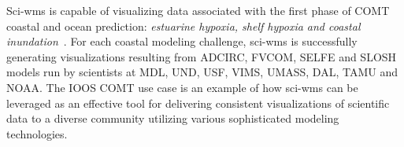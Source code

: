 \documentclass[11pt,twocolumn,twoside]{IEEEtran}
\newcommand{\comt}{COMT}
\newcommand{\ioos}{IOOS}
\newcommand{\noaa}{NOAA}
\newcommand{\sciwms}{sci-wms}
\newcommand{\Sciwms}{Sci-wms}
\newcommand{\adcirc}{ADCIRC}
\newcommand{\fvcom}{FVCOM}
\newcommand{\selfe}{SELFE}
\newcommand{\slosh}{SLOSH}
\newcommand{\mdl}{MDL}
\newcommand{\und}{UND}
\newcommand{\usf}{USF}
\newcommand{\vims}{VIMS}
\newcommand{\umass}{UMASS}
\newcommand{\dal}{DAL}
\newcommand{\tamu}{TAMU}
\begin{document}
\Sciwms{} is capable of visualizing data
associated with the first phase of \comt{} coastal and ocean
prediction: {\em estuarine hypoxia, shelf hypoxia and coastal
  inundation}~\cite{luettich13}. For each coastal modeling challenge,
\sciwms{} is successfully generating visualizations resulting from
\adcirc{}, \fvcom{}, \selfe{} and \slosh{} models run by scientists at
\mdl{}, \und{}, \usf{}, \vims{}, \umass{}, \dal{}, \tamu{} and
\noaa{}. The \ioos{} \comt{} use case is an example of how \sciwms{}
can be leveraged as an effective tool for delivering consistent
visualizations of scientific data to a diverse community utilizing
various sophisticated modeling technologies.




\end{document}
